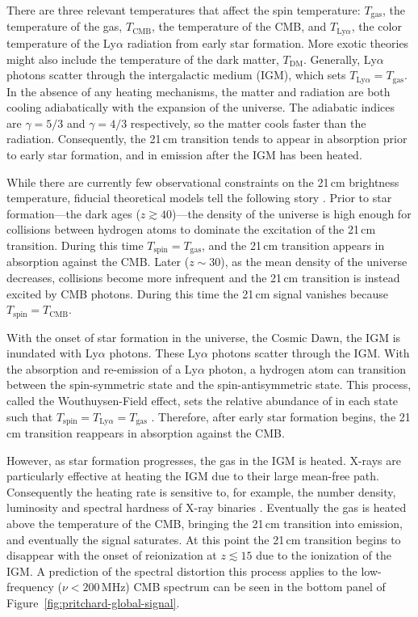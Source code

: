 \begin{bibunit}
There are three relevant temperatures that affect the spin temperature: $T_\text{gas}$, the
temperature of the gas, $T_\text{CMB}$, the temperature of the CMB, and $T_{\text{Ly}\alpha}$, the
color temperature of the Ly$\alpha$ radiation from early star formation. More exotic theories might
also include the temperature of the dark matter, $T_\text{DM}$. Generally, Ly$\alpha$ photons
scatter through the intergalactic medium (IGM), which sets $T_{\text{Ly}\alpha} = T_\text{gas}$. In
the absence of any heating mechanisms, the matter and radiation are both cooling adiabatically with
the expansion of the universe.  The adiabatic indices are $\gamma = 5/3$ and $\gamma = 4/3$
respectively, so the matter cools faster than the radiation. Consequently, the 21\,cm transition
tends to appear in absorption prior to early star formation, and in emission after the IGM has been
heated.

While there are currently few observational constraints on the 21\,cm brightness temperature,
fiducial theoretical models tell the following story \citep[e.g.,][]{2006PhR...433..181F,
2012RPPh...75h6901P}.  Prior to star formation---the dark ages ($z \gtrsim 40$)---the density of the
universe is high enough for collisions between hydrogen atoms to dominate the excitation of the
21\,cm transition.  During this time $T_\text{spin} = T_\text{gas}$, and the 21\,cm transition
appears in absorption against the CMB.  Later ($z \sim 30$), as the mean density of the universe
decreases, collisions become more infrequent and the 21\,cm transition is instead excited by CMB
photons. During this time the 21\,cm signal vanishes because $T_\text{spin} = T_\text{CMB}$.

With the onset of star formation in the universe, the Cosmic Dawn, the IGM is inundated with
Ly$\alpha$ photons.  These Ly$\alpha$ photons scatter through the IGM. With the absorption and
re-emission of a Ly$\alpha$ photon, a hydrogen atom can transition between the spin-symmetric state
and the spin-antisymmetric state. This process, called the Wouthuysen-Field effect, sets the
relative abundance of  in each state such that $T_\text{spin} = T_{\text{Ly}\alpha} =
T_\text{gas}$ \citep{1952AJ.....57R..31W,1958PIRE...46..240F}. Therefore, after early star formation
begins, the 21\,cm transition reappears in absorption against the CMB.

However, as star formation progresses, the gas in the IGM is heated. X-rays are particularly
effective at heating the IGM due to their large mean-free path. Consequently the heating rate is
sensitive to, for example, the number density, luminosity and spectral hardness of X-ray binaries
\citep{2014MNRAS.437L..36F,2017MNRAS.472.2651G}.  Eventually the gas is heated above the temperature
of the CMB, bringing the 21\,cm transition into emission, and eventually the signal saturates. At
this point the 21\,cm transition begins to disappear with the onset of reionization at $z \lesssim
15$ due to the ionization of the IGM. A prediction of the spectral distortion this process applies
to the low-frequency ($\nu < 200\,\text{MHz}$) CMB spectrum can be seen in the bottom panel of
Figure~\ref{fig:pritchard-global-signal}.


\end{bibunit}
